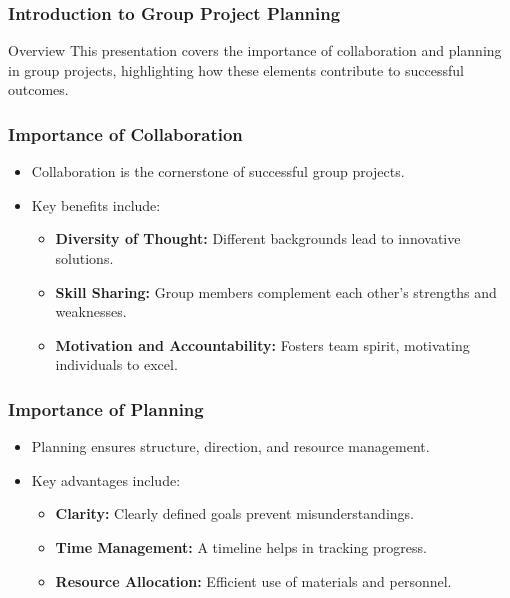 \documentclass[aspectratio=169]{beamer}
\begin{document}
\frame{\titlepage}

\begin{frame}[fragile]
    \frametitle{Introduction to Group Project Planning}
    \begin{block}{Overview}
        This presentation covers the importance of collaboration and planning in group projects, highlighting how these elements contribute to successful outcomes.
    \end{block}
\end{frame}

\begin{frame}[fragile]
    \frametitle{Importance of Collaboration}
    \begin{itemize}
        \item Collaboration is the cornerstone of successful group projects.
        \item Key benefits include:
        \begin{itemize}
            \item \textbf{Diversity of Thought:} Different backgrounds lead to innovative solutions.
            \item \textbf{Skill Sharing:} Group members complement each other's strengths and weaknesses.
            \item \textbf{Motivation and Accountability:} Fosters team spirit, motivating individuals to excel.
        \end{itemize}
    \end{itemize}
\end{frame}

\begin{frame}[fragile]
    \frametitle{Importance of Planning}
    \begin{itemize}
        \item Planning ensures structure, direction, and resource management.
        \item Key advantages include:
        \begin{itemize}
            \item \textbf{Clarity:} Clearly defined goals prevent misunderstandings.
            \item \textbf{Time Management:} A timeline helps in tracking progress.
            \item \textbf{Resource Allocation:} Efficient use of materials and personnel.
        \end{itemize}
    \end{itemize}
\end{frame}
\end{document}
